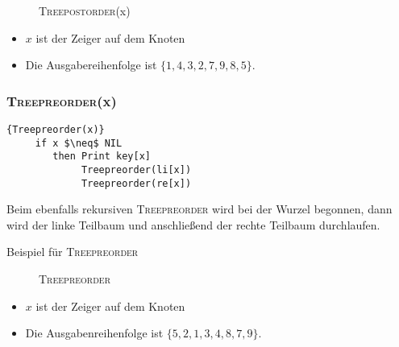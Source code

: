 \documentclass[ngerman,draft,parskip=half*,twoside]{scrreprt}
\theoremstyle{break}
\theoremstyle{nonumberbreak}
\begin{document}
  \begin{figure}[H]
  \centering  
   \caption{\textsc{Treepostorder}(x)}
   \label{171103b}
  \end{figure}
  \begin{itemize}
   \item $x$ ist der Zeiger auf dem Knoten
   \item Die Ausgabereihenfolge ist $\{1,4,3,2,7,9,8,5\}$.
  \end{itemize}
 
 \subsubsection{\textsc{Treepreorder}(x)}
   \begin{Algorithmus}[H]   
    \begin{lstlisting}[frame=tlrb, mathescape=true, title=\textsc{Treepreorder\textnormal{(x)}}, gobble=4]{Treepreorder(x)}
     if x $\neq$ NIL
        then Print key[x]
             Treepreorder(li[x])
             Treepreorder(re[x])
    \end{lstlisting}

   Beim ebenfalls rekursiven \textsc{Treepreorder} wird bei der Wurzel begonnen, dann wird der 
   linke Teilbaum und anschließend der rechte Teilbaum durchlaufen.
   \end{Algorithmus}
Beispiel für \textsc{Treepreorder}
   
  \begin{figure}[H]
  \centering  
   \caption{\textsc{Treepreorder }}
   \label{171103c}
  \end{figure}
 \begin{itemize}
 \item $x$ ist der Zeiger auf dem Knoten
  \item Die Ausgabenreihenfolge ist $\{5,2,1,3,4,8,7,9\}$.
 \end{itemize}
 
\end{document}
